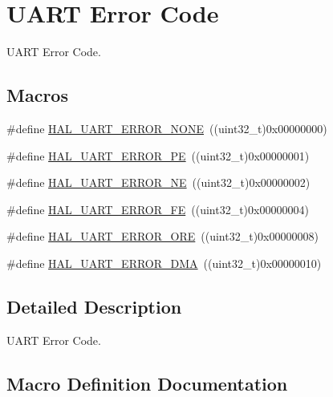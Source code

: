 \hypertarget{group___u_a_r_t___error___code}{}\section{U\+A\+RT Error Code}
\label{group___u_a_r_t___error___code}


U\+A\+RT Error Code.  


\subsection*{Macros}
\begin{DoxyCompactItemize}
\item 
\#define \hyperlink{group___u_a_r_t___error___code_ga275de35cb518c19c284764f3ecb1aac5}{H\+A\+L\+\_\+\+U\+A\+R\+T\+\_\+\+E\+R\+R\+O\+R\+\_\+\+N\+O\+NE}~((uint32\+\_\+t)0x00000000)
\item 
\#define \hyperlink{group___u_a_r_t___error___code_gad447a37701acd199dcb653ce32917970}{H\+A\+L\+\_\+\+U\+A\+R\+T\+\_\+\+E\+R\+R\+O\+R\+\_\+\+PE}~((uint32\+\_\+t)0x00000001)
\item 
\#define \hyperlink{group___u_a_r_t___error___code_ga4a4e32a346dd01f4c41c4fc27afbc72c}{H\+A\+L\+\_\+\+U\+A\+R\+T\+\_\+\+E\+R\+R\+O\+R\+\_\+\+NE}~((uint32\+\_\+t)0x00000002)
\item 
\#define \hyperlink{group___u_a_r_t___error___code_gaf23cb510d4dc2c8e05a45abfbf5f3457}{H\+A\+L\+\_\+\+U\+A\+R\+T\+\_\+\+E\+R\+R\+O\+R\+\_\+\+FE}~((uint32\+\_\+t)0x00000004)
\item 
\#define \hyperlink{group___u_a_r_t___error___code_gaedc030add6c499cf41be7f12dd95930c}{H\+A\+L\+\_\+\+U\+A\+R\+T\+\_\+\+E\+R\+R\+O\+R\+\_\+\+O\+RE}~((uint32\+\_\+t)0x00000008)
\item 
\#define \hyperlink{group___u_a_r_t___error___code_gac1d608ae3499a449cd6cd102e7f86605}{H\+A\+L\+\_\+\+U\+A\+R\+T\+\_\+\+E\+R\+R\+O\+R\+\_\+\+D\+MA}~((uint32\+\_\+t)0x00000010)
\end{DoxyCompactItemize}


\subsection{Detailed Description}
U\+A\+RT Error Code. 



\subsection{Macro Definition Documentation}
